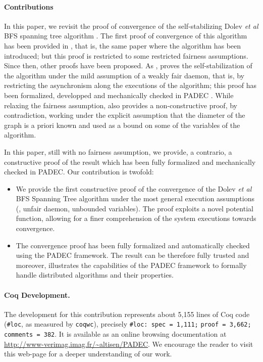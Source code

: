 \paragraph{Contributions}
In this paper, we revisit the proof of convergence of the
self-stabilizing Dolev \emph{et al} BFS spanning tree
algorithm \cite{DIM93}.  The first proof of convergence of this
algorithm has been provided in \cite{DIM93}, that is, the same paper
where the algorithm has been introduced; but this proof is restricted
to some restricted fairness assumptions.  Since then, other proofs
have been proposed.
As \cite{DIM93}, \cite{thebook} proves the self-stabilization of the
algorithm under the mild assumption of a weakly fair daemon, that is,
by restricting the asynchronism along the executions of the algorithm;
this proof has been formalized, developped and mechanically checked in
PADEC \cite{AltisenCD23}.
While relaxing the fairness assumption,
\cite{thebook} also provides a non-constructive proof, by
contradiction, working under the explicit assumption that the diameter
of the graph is a priori known and used as a bound on some of the
variables of the algorithm.

In this paper, still with no fairness assumption, we provide, a
contrario, a constructive proof of the result which has been fully
formalized and mechanically checked in PADEC.
Our contribution is twofold:
\begin{itemize}
\item We provide the first constructive proof of the convergence of
  the Dolev \emph{et al} BFS Spanning Tree algorithm under the most
  general execution assumptions (\ie, unfair daemon, unbounded
  variables). The proof exploits a novel potential function, allowing
  for a finer comprehension of the system executions towards
  convergence.
\item The convergence proof has been fully formalized and
  automatically checked using the PADEC framework.  The result can be
  therefore fully trusted and moreover, illustrates the capabilities
  of the PADEC framework to formally handle distributed algorithms and
  their properties.
\end{itemize}

\paragraph{Coq Development.}  The development for this contribution
represents about 5,155 lines of Coq code (\lstinline|#loc|, as
measured by \lstinline|coqwc|), precisely
\lstinline|#loc: spec = 1,111;|
\lstinline|proof = 3,662;| \lstinline|comments = 382|.  It
 is available as an online browsing documentation at
\url{http://www-verimag.imag.fr/~altisen/PADEC}. We encourage the
reader to visit this web-page for a deeper understanding of our work.

